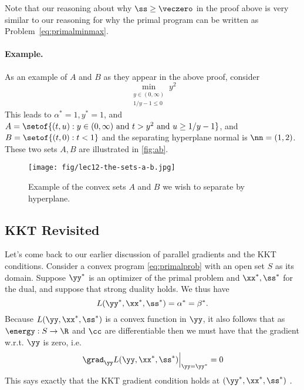 \begin{remark*}
  Note that our reasoning about why $\ss \geq \veczero$ in the proof
  above is very similar to our reasoning for why the primal program
  can be written as Problem~\eqref{eq:primalminmax}.
\end{remark*}

\paragraph{Example.}
As an example of $A$ and $B$ as they appear in the above proof,
consider
\[
\min_{\substack{y \in (0,\infty) \\ 1/y
    -1 \leq 0}}
y^2
\]
 This leads to $\alpha^* = 1,
    y^* =1$, and $A = \setof{ (t,u): y \in (0,\infty) \text{ and } t >y^2
       \text{ and } u \geq 1/y-1}$, and $B = \setof{ (t,0) : t < 1}$ and the separating hyperplane normal is $\nn = (1,2)$.
These two sets $A,B$ are illustrated in \autoref{fig:ab}.
\begin{figure}[H]
  \centering
  \texttt{[image: fig/lec12-the-sets-a-b.jpg]}
  \caption{Example of the convex sets $A$ and $B$ we wish to separate by hyperplane.}
\label{fig:ab}
\end{figure}



\subsection{KKT Revisited}
Let's come back to our earlier discussion of parallel gradients and the
KKT conditions.
 Consider a convex program \eqref{eq:primalprob} with an open set $S$
 as its domain.
Suppose $\yy^*$ is an optimizer of the primal problem and $\xx^*,
\ss^*$ for the dual, and suppose that strong duality holds.
We thus have
\[ L(\yy^*, \xx^*, \ss^*) = \alpha^* = \beta^*. \]
Because $L(\yy, \xx^*, \ss^*)$ is a convex function in $\yy$, it also
follows that as $\energy: S \to \R$ and $\cc$ are differentiable then we must have that the
gradient w.r.t. $\yy$ is zero, i.e.
\begin{equation}
  \left.\grad_{\yy}L(\yy, \xx^*,
    \ss^*)\right|_{\yy=\yy^*} = 0
  \label{eq:KKTgradAtOpt}
\end{equation}
This says exactly that the KKT gradient condition holds at $(\yy^*, \xx^*, \ss^*)$ .

